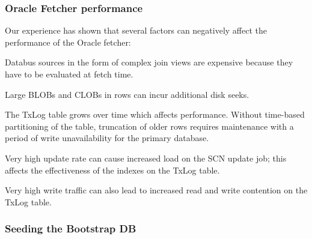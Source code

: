 \subsubsection{Oracle Fetcher performance}

Our experience has shown that several factors can negatively affect the performance of the Oracle fetcher:
\begin{enumerate*}
\item Databus sources in the form of complex join views are expensive because they have to be evaluated at fetch time.
\item Large BLOBs and CLOBs in rows can incur additional disk seeks.
\item The TxLog table grows over time which affects performance. Without time-based partitioning of the table, truncation of older rows requires maintenance with a period of write unavailability for the primary database.
\item Very high update rate can cause increased load on the SCN update job; this affects the effectiveness of the indexes on the TxLog table.
\item Very high write traffic can also lead to increased read and write contention on the TxLog table.
\end{enumerate*}

\subsubsection{Seeding the Bootstrap DB}


